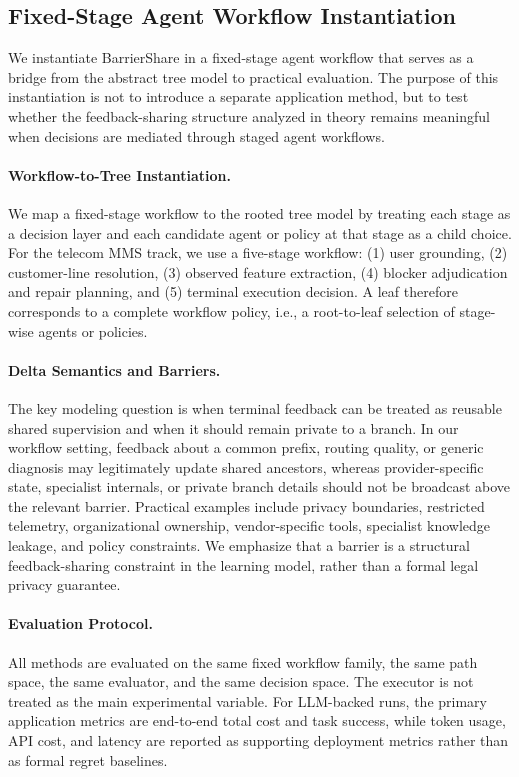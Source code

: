 \documentclass{article}
\begin{document}
\subsection{Fixed-Stage Agent Workflow Instantiation}

We instantiate BarrierShare in a fixed-stage agent workflow that serves as a bridge from the abstract tree model to practical evaluation. The purpose of this instantiation is not to introduce a separate application method, but to test whether the feedback-sharing structure analyzed in theory remains meaningful when decisions are mediated through staged agent workflows.

\paragraph{Workflow-to-Tree Instantiation.}
We map a fixed-stage workflow to the rooted tree model by treating each stage as a decision layer and each candidate agent or policy at that stage as a child choice. For the telecom MMS track, we use a five-stage workflow:
(1) user grounding,
(2) customer-line resolution,
(3) observed feature extraction,
(4) blocker adjudication and repair planning, and
(5) terminal execution decision.
A leaf therefore corresponds to a complete workflow policy, i.e., a root-to-leaf selection of stage-wise agents or policies.

\paragraph{Delta Semantics and Barriers.}
The key modeling question is when terminal feedback can be treated as reusable shared supervision and when it should remain private to a branch. In our workflow setting, feedback about a common prefix, routing quality, or generic diagnosis may legitimately update shared ancestors, whereas provider-specific state, specialist internals, or private branch details should not be broadcast above the relevant barrier. Practical examples include privacy boundaries, restricted telemetry, organizational ownership, vendor-specific tools, specialist knowledge leakage, and policy constraints. We emphasize that a barrier is a structural feedback-sharing constraint in the learning model, rather than a formal legal privacy guarantee.

\paragraph{Evaluation Protocol.}
All methods are evaluated on the same fixed workflow family, the same path space, the same evaluator, and the same decision space. The executor is not treated as the main experimental variable. For LLM-backed runs, the primary application metrics are end-to-end total cost and task success, while token usage, API cost, and latency are reported as supporting deployment metrics rather than as formal regret baselines.
\end{document}

